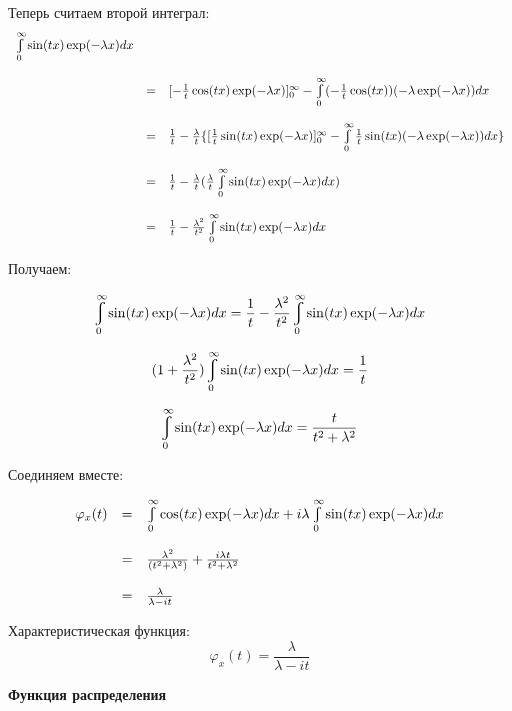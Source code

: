 \documentclass[a4paper,12pt, oneside]{book}
\let\int\varint
\begin{document}
	Теперь считаем второй интеграл:
	$$
	\begin{array}{rcl}
	 \int\limits_0^\infty \sin(tx)\exp(-\lambda x)dx\\
	 \\
	 &=&[-\frac{1}{t} \cos(tx) \exp(-\lambda x)]_0^\infty- \int\limits_{0}^{\infty}(-\frac{1}{t} \cos(tx))(-\lambda \exp(-\lambda x))dx\\
	 \\
	 &=&\frac{1}{t} - \frac{\lambda}{t}\{ [\frac{1}{t} \sin(tx)\exp(-\lambda x)]_0^\infty - \int\limits_{0}^{\infty} \frac{1}{t} \sin(tx) (-\lambda \exp(-\lambda x ))dx  \}\\
	 \\
	 &=&\frac{1}{t} - \frac{\lambda}{t} (\frac{\lambda}{t} \int\limits_0^\infty \sin(tx) \exp(-\lambda x)dx)\\
	 \\
	  &=&\frac{1}{t} - \frac{\lambda ^2}{t^2} \int\limits_{0}^{\infty} \sin(tx) \exp(-\lambda x)dx
	 \end{array}
	$$
	
	Получаем:
	
	$$
	\int_0^\infty \sin(tx)\exp(-\lambda x)dx = \frac{1}{t} - \frac{\lambda ^2}{t^2} \int_{0}^{\infty} \sin(tx) \exp(-\lambda x)dx
	$$
	
	$$
	(1 + \frac{\lambda^2}{t^2}) \int_0^\infty \sin(tx)\exp(-\lambda x)dx = \frac{1}{t}
	$$
	
	$$
	\int_0^\infty \sin(tx)\exp(-\lambda x)dx = \frac{t}{t^2 + \lambda^2}
	$$

	Соединяем вместе:
	
	$$
	\begin{array}{rcl}
	\varphi_x(t) &=& \int\limits_0^\infty \cos(tx)\exp(-\lambda x)dx +  i \lambda \int\limits_0^\infty \sin(tx)\exp(-\lambda x)dx\\
	\\
	&=&\frac{\lambda^2}{(t^2 + \lambda^2)} + \frac{i\lambda t}{t^2 + \lambda^2}\\
	\\
	&=&\frac{\lambda}{\lambda - i t}
	\end{array}	
	$$
	
	\vspace{\baselineskip}
	Характеристическая функция:
	$$
	\varphi_x(t) = \frac{\lambda}{\lambda - i t}
	$$
	
	
	\vspace{5mm}
	\large{\textbf{{Функция распределения}}}
	\vspace{5mm}
	
\end{document}
